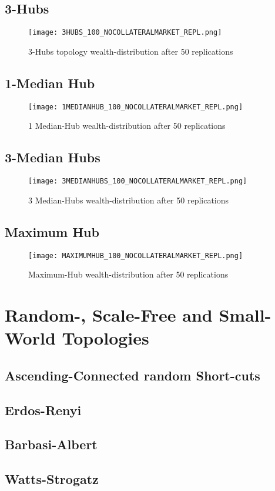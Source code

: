 \documentclass[Bachelorarbeit.tex]{subfiles}
\begin{document}
\subsection{3-Hubs}
\begin{figure}[!htbp]
	\centering
  \texttt{[image: 3HUBS\_100\_NOCOLLATERALMARKET\_REPL.png]}
	\caption{3-Hubs topology wealth-distribution after 50 replications}
	\label{fig1}
\end{figure}

\subsection{1-Median Hub}
\begin{figure}[!htbp]
	\centering
  \texttt{[image: 1MEDIANHUB\_100\_NOCOLLATERALMARKET\_REPL.png]}
	\caption{1 Median-Hub wealth-distribution after 50 replications}
	\label{fig1}
\end{figure}

\subsection{3-Median Hubs}
\begin{figure}[!htbp]
	\centering
  \texttt{[image: 3MEDIANHUBS\_100\_NOCOLLATERALMARKET\_REPL.png]}
	\caption{3 Median-Hubs wealth-distribution after 50 replications}
	\label{fig1}
\end{figure}

\subsection{Maximum Hub}
\begin{figure}[!htbp]
	\centering
  \texttt{[image: MAXIMUMHUB\_100\_NOCOLLATERALMARKET\_REPL.png]}
	\caption{Maximum-Hub wealth-distribution after 50 replications}
	\label{fig1}
\end{figure}

\section{Random-, Scale-Free and Small-World Topologies}
\subsection{Ascending-Connected random Short-cuts}
\subsection{Erdos-Renyi}
\subsection{Barbasi-Albert}
\subsection{Watts-Strogatz}
\end{document}
